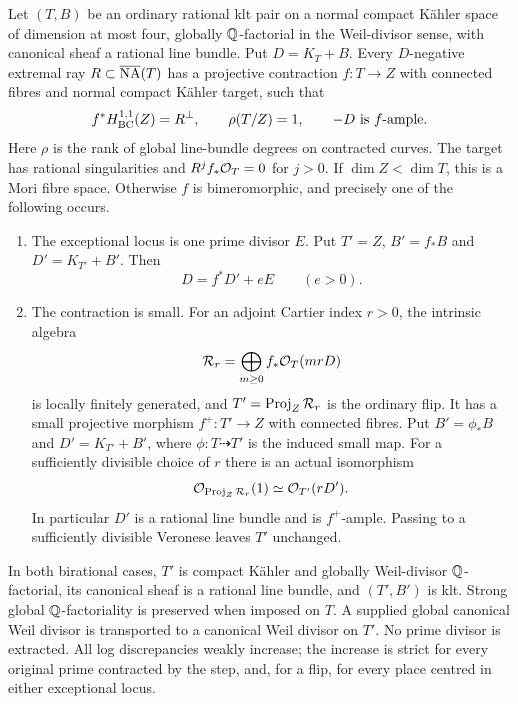 \begin{proposition}\label{prop:ordinary-step}
Let $(T,B)$ be an ordinary rational klt pair on a normal compact K\"ahler
space of dimension at most four, globally $\mathbb Q$-factorial in the Weil-divisor sense, with canonical
sheaf a rational line bundle.  Put $D=K_T+B$.  Every $D$-negative
extremal ray $R\subset\overline{\mathrm{NA}}(T)$ has a projective contraction $f:T\to Z$
with connected fibres and normal compact K\"ahler target, such that
\begin{equation}\label{eq:ordinary-negative-bc}
 f^*H^{1,1}_{\mathrm{BC}}(Z)=R^\perp,\qquad
 \rho(T/Z)=1,\qquad -D\text{ is }f\text{-ample}.
\end{equation}
Here $\rho$ is the rank of global line-bundle degrees on contracted
curves.  The target has rational singularities and
$R^j f_*\mathcal O_T=0$ for $j>0$.  If $\dim Z<\dim T$, this is a Mori fibre
space.  Otherwise $f$ is bimeromorphic, and precisely one of the
following occurs.
\begin{enumerate}[label=\textup{(\roman*)}]
\item The exceptional locus is one prime divisor $E$.  Put $T'=Z$,
$B'=f_*B$ and $D'=K_{T'}+B'$.  Then
\begin{equation}\label{eq:ordinary-divisorial-difference}
 D=f^*D'+eE\qquad(e>0).
\end{equation}
\item The contraction is small.  For an adjoint Cartier index $r>0$,
the intrinsic algebra
\begin{equation}\label{eq:ordinary-flip-algebra}
 \mathcal R_r=\bigoplus_{m\geq0}f_*\mathcal O_T(mrD)
\end{equation}
is locally finitely generated, and $T'=\operatorname{Proj}_Z\mathcal R_r$ is the ordinary
flip.  It has a small projective morphism $f^+:T'\to Z$ with connected
fibres.  Put $B'=\phi_*B$ and $D'=K_{T'}+B'$, where
$\phi:T\dashrightarrow T'$ is the induced small map.  For a sufficiently
divisible choice of $r$ there is an actual isomorphism
\begin{equation}\label{eq:ordinary-tautological}
 \mathcal O_{\operatorname{Proj}_Z\mathcal R_r}(1)\simeq\mathcal O_{T'}(rD').
\end{equation}
In particular $D'$ is a rational line bundle and is $f^+$-ample.
Passing to a sufficiently divisible Veronese leaves $T'$ unchanged.
\end{enumerate}
In both birational cases, $T'$ is compact K\"ahler and globally
Weil-divisor $\mathbb Q$-factorial, its canonical sheaf is a rational line
bundle, and $(T',B')$ is klt.  Strong global $\mathbb Q$-factoriality is
preserved when imposed on $T$.  A supplied global canonical Weil divisor
is transported to a canonical Weil divisor on $T'$.  No prime divisor is
extracted.  All log discrepancies weakly increase; the increase is strict
for every original prime contracted by the step, and, for a flip, for
every place centred in either exceptional locus.
\end{proposition}


